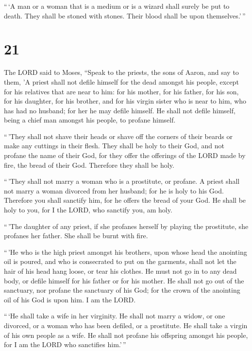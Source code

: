 ``\,`A man or a woman that is a medium or is a wizard
shall surely be put to death. They shall be stoned with stones. Their
blood shall be upon themselves.'\,''

\hypertarget{section-20}{%
\section{21}\label{section-20}}

 The LORD said to Moses, ``Speak to the priests, the sons of
Aaron, and say to them, 'A priest shall not defile himself for the dead
amongst his people,  except for his relatives that are near
to him: for his mother, for his father, for his son, for his daughter,
for his brother,  and for his virgin sister who is near to
him, who has had no husband; for her he may defile himself. 
He shall not defile himself, being a chief man amongst his people, to
profane himself.

 ``\,'They shall not shave their heads or shave off the
corners of their beards or make any cuttings in their flesh.
 They shall be holy to their God, and not profane the name
of their God, for they offer the offerings of the LORD made by fire, the
bread of their God. Therefore they shall be holy.

 ``\,'They shall not marry a woman who is a prostitute, or
profane. A priest shall not marry a woman divorced from her husband; for
he is holy to his God.  Therefore you shall sanctify him,
for he offers the bread of your God. He shall be holy to you, for I the
LORD, who sanctify you, am holy.

 ``\,'The daughter of any priest, if she profanes herself by
playing the prostitute, she profanes her father. She shall be burnt with
fire.

 ``\,'He who is the high priest amongst his brothers, upon
whose head the anointing oil is poured, and who is consecrated to put on
the garments, shall not let the hair of his head hang loose, or tear his
clothes.  He must not go in to any dead body, or defile
himself for his father or for his mother.  He shall not go
out of the sanctuary, nor profane the sanctuary of his God; for the
crown of the anointing oil of his God is upon him. I am the LORD.

 ``\,`He shall take a wife in her virginity. 
He shall not marry a widow, or one divorced, or a woman who has been
defiled, or a prostitute. He shall take a virgin of his own people as a
wife.  He shall not profane his offspring amongst his
people, for I am the LORD who sanctifies him.'\,''

